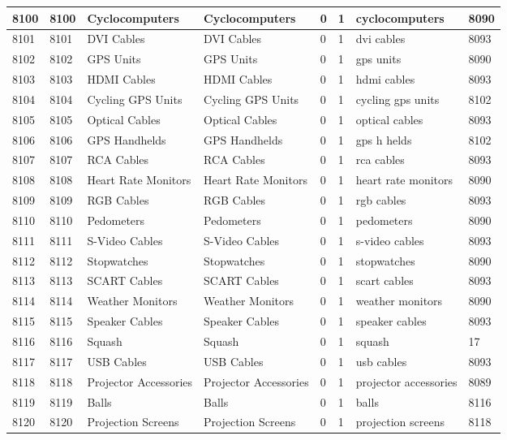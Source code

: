 \begin{longtable}{|l|l|l|l|l|l|l|l|}
8100 & 8100 & Cyclocomputers & Cyclocomputers & 0 & 1 & cyclocomputers & 8090 \\ \hline 
8101 & 8101 & DVI Cables & DVI Cables & 0 & 1 & dvi cables & 8093 \\ \hline 
8102 & 8102 & GPS Units & GPS Units & 0 & 1 & gps units & 8090 \\ \hline 
8103 & 8103 & HDMI Cables & HDMI Cables & 0 & 1 & hdmi cables & 8093 \\ \hline 
8104 & 8104 & Cycling GPS Units & Cycling GPS Units & 0 & 1 & cycling gps units & 8102 \\ \hline 
8105 & 8105 & Optical Cables & Optical Cables & 0 & 1 & optical cables & 8093 \\ \hline 
8106 & 8106 & GPS Handhelds & GPS Handhelds & 0 & 1 & gps h helds & 8102 \\ \hline 
8107 & 8107 & RCA Cables & RCA Cables & 0 & 1 & rca cables & 8093 \\ \hline 
8108 & 8108 & Heart Rate Monitors & Heart Rate Monitors & 0 & 1 & heart rate monitors & 8090 \\ \hline 
8109 & 8109 & RGB Cables & RGB Cables & 0 & 1 & rgb cables & 8093 \\ \hline 
8110 & 8110 & Pedometers & Pedometers & 0 & 1 & pedometers & 8090 \\ \hline 
8111 & 8111 & S-Video Cables & S-Video Cables & 0 & 1 & s-video cables & 8093 \\ \hline 
8112 & 8112 & Stopwatches & Stopwatches & 0 & 1 & stopwatches & 8090 \\ \hline 
8113 & 8113 & SCART Cables & SCART Cables & 0 & 1 & scart cables & 8093 \\ \hline 
8114 & 8114 & Weather Monitors & Weather Monitors & 0 & 1 & weather monitors & 8090 \\ \hline 
8115 & 8115 & Speaker Cables & Speaker Cables & 0 & 1 & speaker cables & 8093 \\ \hline 
8116 & 8116 & Squash & Squash & 0 & 1 & squash & 17 \\ \hline 
8117 & 8117 & USB Cables & USB Cables & 0 & 1 & usb cables & 8093 \\ \hline 
8118 & 8118 & Projector Accessories & Projector Accessories & 0 & 1 & projector accessories & 8089 \\ \hline 
8119 & 8119 & Balls & Balls & 0 & 1 & balls & 8116 \\ \hline 
8120 & 8120 & Projection Screens & Projection Screens & 0 & 1 & projection screens & 8118 \\ \hline 

\end{longtable}
